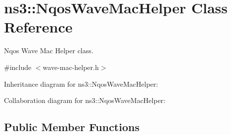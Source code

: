 \hypertarget{classns3_1_1NqosWaveMacHelper}{}\section{ns3\+:\+:Nqos\+Wave\+Mac\+Helper Class Reference}
\label{classns3_1_1NqosWaveMacHelper}


Nqos Wave Mac Helper class.  




{\ttfamily \#include $<$wave-\/mac-\/helper.\+h$>$}



Inheritance diagram for ns3\+:\+:Nqos\+Wave\+Mac\+Helper\+:


Collaboration diagram for ns3\+:\+:Nqos\+Wave\+Mac\+Helper\+:
\subsection*{Public Member Functions}
